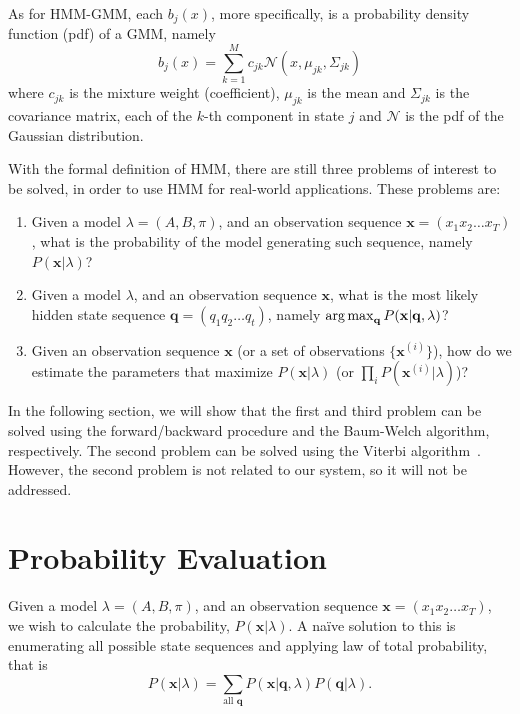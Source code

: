 \documentclass[12pt,final,twoside]{report}
\begin{document}
As for HMM-GMM, each $b_j(x)$, more specifically, is a probability density function (pdf) of a GMM, namely
\[ b_j(x) = \sum_{k=1}^M c_{jk} \mathcal{N}(x, \mu_{jk}, \Sigma_{jk}) \]
where $c_{jk}$ is the mixture weight (coefficient), $\mu_{jk}$ is the mean and $\Sigma_{jk}$ is the covariance matrix, each of the $k$-th component in state $j$ and $\mathcal{N}$ is the pdf of the Gaussian distribution. 

With the formal definition of HMM, there are still three problems of interest to be solved, in order to use HMM for real-world applications. These problems are:
\begin{enumerate}
  \item Given a model $\lambda=(A, B, \pi)$, and an observation sequence $\mathbf{x} = (x_1 x_2 \dots x_T)$, what is the probability of the model generating such sequence, namely $P(\mathbf{x}|\lambda)$?
  \item Given a model $\lambda$, and an observation sequence $\mathbf{x}$, what is the most likely hidden state sequence $\mathbf{q} = (q_1 q_2 \dots q_t)$, namely $\operatorname*{arg\,max}_{\mathbf{q}}P(\mathbf{x}|\mathbf{q},\lambda)$?
  \item Given an observation sequence $\mathbf{x}$ (or a set of observations $\{\mathbf{x}^{(i)}\}$), how do we estimate the parameters that maximize $P(\mathbf{x}|\lambda)$ (or $\prod_{i} P(\mathbf{x}^{(i)}|\lambda) $)?
\end{enumerate}

In the following section, we will show that the first and third problem can be solved using the forward/backward procedure and the Baum-Welch algorithm, respectively. The second problem can be solved using the Viterbi algorithm~\cite{forney_viterbi_1973}. However, the second problem is not related to our system, so it will not be addressed.

\section{Probability Evaluation}
Given a model $\lambda=(A, B, \pi)$, and an observation sequence $\mathbf{x} = (x_1 x_2 \dots x_T)$, we wish to calculate the probability, $P(\mathbf{x}|\lambda)$. A na\"ive solution to this is enumerating all possible state sequences and applying law of total probability, that is
\begin{equation}
  P(\mathbf{x}|\lambda) = \sum_{\text{all } \mathbf{q}} P(\mathbf{x}|\mathbf{q},\lambda) P(\mathbf{q}|\lambda) .
\end{equation}
\end{document}
